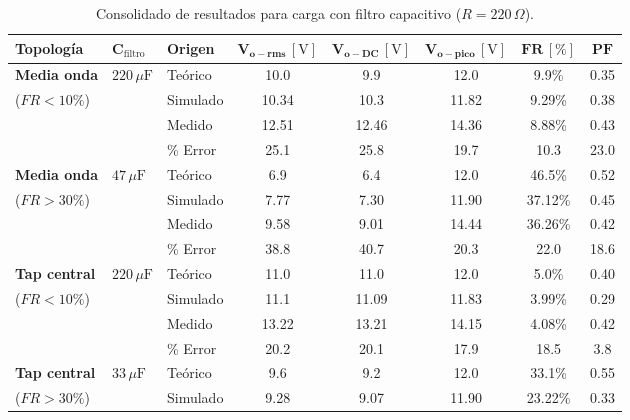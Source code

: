 \begin{table}[!t]
\centering
\small
\caption{Consolidado de resultados para carga con filtro capacitivo ($R = 220\,\Omega$).}
\label{tab:consolidado_tabla2}
\begin{tabular}{lllccccc}
\toprule
\textbf{Topología} & $\mathbf{C_{\mathrm{filtro}}}$ & \textbf{Origen} & $\mathbf{V_{o-rms}}\,\mathrm{[V]}$ & $\mathbf{V_{o-DC}}\,\mathrm{[V]}$ & $\mathbf{V_{o-pico}}\,\mathrm{[V]}$ & $\mathbf{FR}\,[\%]$ & $\mathbf{PF}$ \\
\midrule
\textbf{Media onda} & \multirow{4}{*}{$220\,\mu\mathrm{F}$} 
& Teórico   & 10.0  & 9.9   & 12.0  & 9.9\% & 0.35 \\
($FR < 10\%$) & & Simulado  &10.34 &10.3 &11.82 &9.29\% &0.38 \\
              & & Medido    & 12.51 & 12.46 & 14.36 & 8.88\% & 0.43 \\
              & & \% Error  & 25.1 & 25.8 & 19.7 & 10.3 & 23.0 \\
\cmidrule(lr){2-8}
\textbf{Media onda} & \multirow{4}{*}{$47\,\mu\mathrm{F}$} 
& Teórico   & 6.9   & 6.4   & 12.0  & 46.5\% & 0.52 \\
($FR > 30\%$) & & Simulado  &7.77 &7.30 &11.90 &37.12\% &0.45 \\
              & & Medido    & 9.58 & 9.01 & 14.44 & 36.26\% & 0.42 \\
              & & \% Error  & 38.8 & 40.7 & 20.3 & 22.0 & 18.6 \\
\midrule
\textbf{Tap central} & \multirow{4}{*}{$220\,\mu\mathrm{F}$} 
& Teórico   & 11.0  & 11.0  & 12.0  & 5.0\% & 0.40 \\
($FR < 10\%$) & & Simulado  &11.1 &11.09 &11.83 &3.99\% &0.29 \\
              & & Medido    & 13.22 & 13.21 & 14.15 & 4.08\% & 0.42 \\
              & & \% Error  & 20.2 & 20.1 & 17.9 & 18.5 & 3.8 \\
\cmidrule(lr){2-8}
\textbf{Tap central} & \multirow{4}{*}{$33\,\mu\mathrm{F}$} 
& Teórico   & 9.6   & 9.2   & 12.0  & 33.1\% & 0.55 \\
($FR > 30\%$) & & Simulado  &9.28 &9.07 &11.90 &23.22\% &0.33 \\

\end{tabular}
\end{table}
